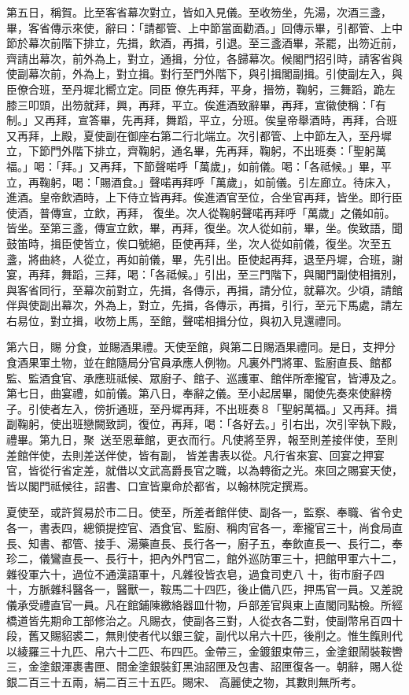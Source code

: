 \begin{pinyinscope}
 第五日，稱賀。比至客省幕次對立，皆如入見儀。至收笏坐，先湯，次酒三盞，畢，客省傳示來使，辭曰：「請都管、上中節當面勸酒。」回傳示畢，引都管、上中節於幕次前階下排立，先揖，飲酒，再揖，引退。至三盞酒畢，茶罷，出笏近前，齊請出幕次，前外為上，對立，通揖，分位，各歸幕次。候閣門招引時，請客省與使副幕次前，外為上，對立揖。對行至門外階下，與引揖閣副揖。引使副左入，與臣僚合班，至丹墀北嚮立定。同臣
 僚先再拜，平身，搢笏，鞠躬，三舞蹈，跪左膝三叩頭，出笏就拜，興，再拜，平立。俟進酒致辭畢，再拜，宣徽使稱：「有制。」又再拜，宣答畢，先再拜，舞蹈，平立，分班。俟皇帝舉酒時，再拜，合班又再拜，上殿，夏使副在御座右第二行北端立。次引都管、上中節左入，至丹墀立，下節門外階下排立，齊鞠躬，通名畢，先再拜，鞠躬，不出班奏：「聖躬萬福。」喝：「拜。」又再拜，下節聲喏呼「萬歲」，如前儀。喝：「各祗候。」畢，平立，再鞠躬，喝：「賜酒食。」聲喏再拜呼「萬歲」，如前儀。引左廊立。待床入，進酒。皇帝飲酒時，上下侍立皆再拜。俟進酒官至位，合坐官再拜，皆坐。即行臣使酒，普傳宣，立飲，再拜，
 復坐。次人從鞠躬聲喏再拜呼「萬歲」之儀如前。皆坐。至第三盞，傳宣立飲，畢，再拜，復坐。次人從如前，畢，坐。俟致語，聞鼓笛時，揖臣使皆立，俟口號絕，臣使再拜，坐，次人從如前儀，復坐。次至五盞，將曲終，人從立，再如前儀，畢，先引出。臣使起再拜，退至丹墀，合班，謝宴，再拜，舞蹈，三拜，喝：「各祗候。」引出，至三門階下，與閣門副使相揖別，與客省同行，至幕次前對立，先揖，各傳示，再揖，請分位，就幕次。少頃，請館伴與使副出幕次，外為上，對立，先揖，各傳示，再揖，引行，至元下馬處，請左右易位，對立揖，收笏上馬，至館，聲喏相揖分位，與初入見還禮同。



 第六日，賜
 分食，並賜酒果禮。天使至館，與第二日賜酒果禮同。是日，支押分食酒果軍土物，並在館隨局分官員承應人例物。凡裏外門將軍、監廚直長、館都監、監酒食官、承應班祗候、眾廚子、館子、巡護軍、館伴所牽攏官，皆溥及之。第七日，曲宴禮，如前儀。第八日，奉辭之儀。至小起居畢，閣使先奏來使辭榜子。引使者左入，傍折通班，至丹墀再拜，不出班奏８「聖躬萬福。」又再拜。揖副鞠躬，使出班戀闕致詞，復位，再拜，喝：「各好去。」引右出，次引宰執下殿，禮畢。第九日，聚，送至恩華館，更衣而行。凡使將至界，報至則差接伴使，至則差館伴使，去則差送伴使，皆有副，
 皆差書表以從。凡行省來宴、回宴之押宴官，皆從行省定差，就借以文武高爵長官之職，以為轉銜之光。來回之賜宴天使，皆以閣門祗候往，詔書、口宣皆稟命於都省，以翰林院定撰焉。



 夏使至，或許貿易於市二日。使至，所差者館伴使、副各一，監察、奉職、省令史各一，書表四，總領提控官、酒食官、監廚、稱肉官各一，牽攏官三十，尚食局直長、知書、都管、接手、湯藥直長、長行各一，廚子五，奉飲直長一、長行二，奉珍二，儀鸞直長一、長行十，把內外門官二，館外巡防軍三十，把館甲軍六十二，雜役軍六十，過位不通漢語軍十，凡雜役皆衣皂，過食司吏八
 十，街市廚子四十，方脈雜科醫各一，醫獸一，鞍馬二十四匹，後止備八匹，押馬官一員。又差說儀承受禮直官一員。凡在館鋪陳繳絡器皿什物，戶部差官與東上直閣同點檢。所經橋道皆先期命工部修治之。凡賜衣，使副各三對，人從衣各二對，使副幣帛百四十段，舊又賜貂裘二，無則使者代以銀三錠，副代以帛六十匹，後削之。惟生餼則代以綾羅三十九匹、帛六十二匹、布四匹。金帶三，金鍍銀束帶三，金塗銀鬧裝鞍轡三，金塗銀渾裹書匣、間金塗銀裝釘黑油詔匣及包書、詔匣復各一。朝辭，賜人從銀二百三十五兩，絹二百三十五匹。賜宋、
 高麗使之物，其數則無所考。



\end{pinyinscope}
